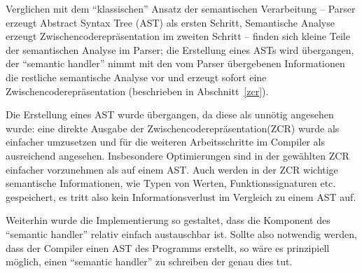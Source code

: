 \documentclass[twoside,a4paper,fleqn,12pt]{book}
\begin{document}


Verglichen mit dem "`klassischen"' Ansatz der semantischen Verarbeitung -- Parser erzeugt Abstract Syntax Tree (AST) als ersten Schritt,
Semantische Analyse erzeugt Zwischencoderepräsentation im zweiten Schritt -- finden sich kleine Teile der semantischen
Analyse im Parser; die Erstellung eines ASTs wird übergangen, der ``semantic handler'' nimmt mit den vom
Parser übergebenen Informationen die restliche semantische Analyse vor und erzeugt sofort eine Zwischencoderepräsentation (beschrieben in Abschnitt~\ref{zcr}).

Die Erstellung eines AST wurde übergangen, da diese als unnötig angesehen wurde: eine direkte Ausgabe der Zwischencoderepräsentation(ZCR)
wurde als einfacher umzusetzen und für die weiteren Arbeitsschritte im Compiler als ausreichend angesehen. 
Insbesondere Optimierungen sind in der gewählten ZCR einfacher vorzunehmen als auf
einem AST. Auch werden in der ZCR wichtige semantische Informationen, wie Typen von Werten, Funktionssignaturen etc. gespeichert,
es tritt also kein Informationsverlust im Vergleich zu einem AST auf.

Weiterhin wurde die Implementierung so gestaltet, dass die Komponent des ``semantic handler'' relativ einfach austauschbar ist.
Sollte also notwendig werden, dass der Compiler einen AST des Programms erstellt, so wäre es prinzipiell möglich,
einen ``semantic handler'' zu schreiben der genau dies tut.

\end{document}
